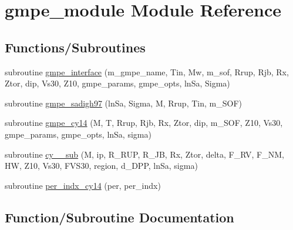 \hypertarget{namespacegmpe__module}{}\section{gmpe\+\_\+module Module Reference}
\label{namespacegmpe__module}
\subsection*{Functions/\+Subroutines}
\begin{DoxyCompactItemize}
\item 
subroutine \hyperlink{namespacegmpe__module_a5f684874da41cb0160ab7c0473b1adf5}{gmpe\+\_\+interface} (m\+\_\+gmpe\+\_\+name, Tin, Mw, m\+\_\+sof, Rrup, Rjb, Rx, Ztor, dip,                                           Vs30, Z10, gmpe\+\_\+params, gmpe\+\_\+opts,                                           ln\+Sa, Sigma)
\item 
subroutine \hyperlink{namespacegmpe__module_a3a1c1fc463d12762d4dcc724f90f876d}{gmpe\+\_\+sadigh97} (ln\+Sa, Sigma, M, Rrup, Tin, m\+\_\+\+S\+O\+F)
\item 
subroutine \hyperlink{namespacegmpe__module_a908fe9e90b79ba090e108746e35b4b02}{gmpe\+\_\+cy14} (M, T, Rrup, Rjb, Rx, Ztor, dip, m\+\_\+\+S\+O\+F, Z10, Vs30, gmpe\+\_\+params, gmpe\+\_\+opts, ln\+Sa, sigma)
\item 
subroutine \hyperlink{namespacegmpe__module_a2b7ab2b80fab7e94cfd35a2e5652bc5a}{cy\+\_\+\_\+sub} (M, ip, R\+\_\+\+R\+U\+P, R\+\_\+\+J\+B, Rx, Ztor, delta, F\+\_\+\+R\+V, F\+\_\+\+N\+M, H\+W, Z10, Vs30, F\+V\+S30, region, d\+\_\+\+D\+P\+P, ln\+Sa, sigma)
\item 
subroutine \hyperlink{namespacegmpe__module_aaef04e7344731f519aba25dbde1bfbc8}{per\+\_\+indx\+\_\+cy14} (per, per\+\_\+indx)
\end{DoxyCompactItemize}


\subsection{Function/\+Subroutine Documentation}
\hypertarget{namespacegmpe__module_a2b7ab2b80fab7e94cfd35a2e5652bc5a}{}
